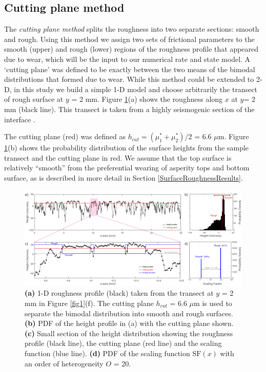\documentclass[draft]{agujournal2019}
\begin{document}
\subsection{Cutting plane method}

The \textit{cutting plane method} splits the roughness into two separate sections: smooth and rough. Using this method we assign two sets of frictional parameters to the smooth (upper) and rough (lower) regions of the roughness profile that appeared due to wear, which will be the input to our numerical rate and state model. A `cutting plane' was defined to be exactly between the two means of the bimodal distributions that formed due to wear. While this method could be extended to 2-D, in this study we build a simple 1-D model and choose arbitrarily the transect of rough surface at $y$ = 2 mm. Figure \ref{fig3}(a) shows the roughness along $x$ at $y$= 2 mm (black line).  This transect is taken from a highly seismogenic section of the interface \cite{Selvadurai2015}. 

The cutting plane (red) was defined as $h_{cut} = \left(\mu^{*}_{1}+\mu^{*}_{2} \right)/2$ = 6.6 $\mu$m.  Figure \ref{fig3}(b) shows the probability distribution of the surface heights from the sample transect and the cutting plane in red. We assume that the top surface is relatively ``smooth'' from the preferential wearing of asperity tops and bottom surface, as is described in more detail in Section \ref{SurfaceRoughnessResults}.

\begin{figure}[ht]
	\centering
	\includegraphics{FIG3.pdf} 
	\caption{ \textbf{(a)} 1-D roughness profile (black) taken from the transect at $y$ = 2 mm in Figure \ref{fig1}(f).  The cutting plane $h_{cut}$ = 6.6 $\mu$m is used to separate the bimodal distribution into smooth and rough surfaces. \textbf{(b)} PDF of the height profile in (a) with the cutting plane shown. \textbf{(c)} Small section of the height distribution showing the roughness profile (black line), the cutting plane (red line) and the scaling function (blue line). \textbf{(d)} PDF of the scaling function $\mathrm{SF}(x)$ with an order of heterogeneity $O$ = 20.}
	\label{fig3}
\end{figure}
\end{document}
